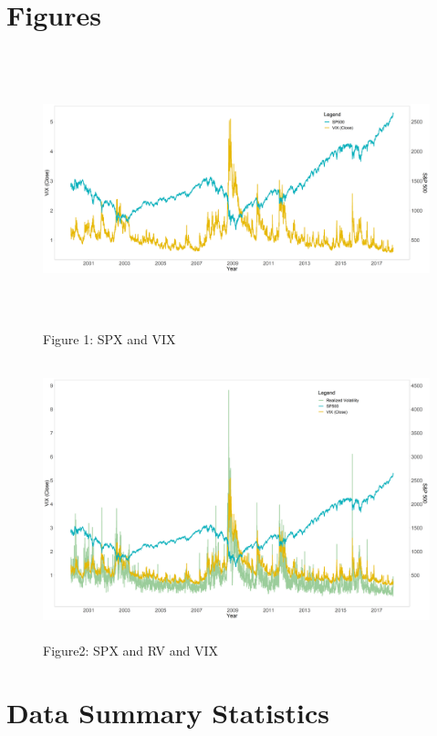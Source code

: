 
\appendix
\section{Figures}
%
\begin{figure}[!htbp]\label{fig1}\caption{Figure 1: \ac{SPX} and VIX}
\includegraphics[width=16cm, height=8cm]{pictures/SPandViX.png}
\end{figure}
%
\begin{figure}[!htbp]\label{fig2}\caption{Figure2: \ac{SPX} and RV and VIX}
\includegraphics[width=16cm, height=8cm]{pictures/SPandVolandViX.png}
\end{figure}
%

\newpage

\section{Data Summary Statistics}

